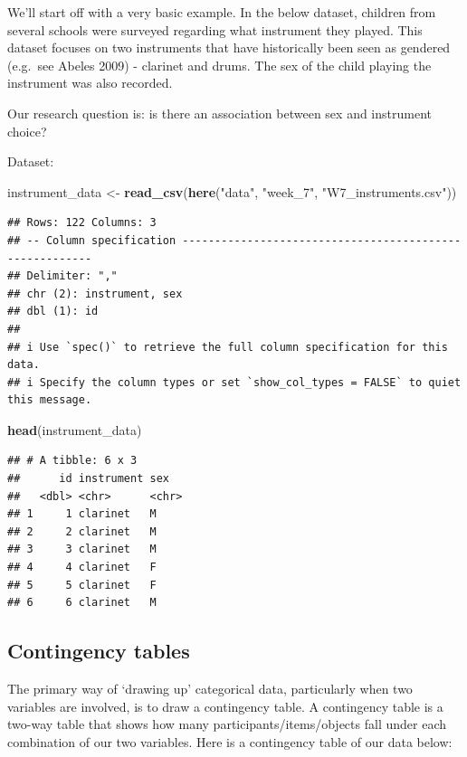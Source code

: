 \documentclass[
]{book}
\newenvironment{Shaded}{\begin{snugshade}}{\end{snugshade}}
\newcommand{\FunctionTok}[1]{\textcolor[rgb]{0.13,0.29,0.53}{\textbf{#1}}}
\newcommand{\NormalTok}[1]{#1}
\newcommand{\OtherTok}[1]{\textcolor[rgb]{0.56,0.35,0.01}{#1}}
\newcommand{\StringTok}[1]{\textcolor[rgb]{0.31,0.60,0.02}{#1}}
\begin{document}
We'll start off with a very basic example. In the below dataset, children from several schools were surveyed regarding what instrument they played. This dataset focuses on two instruments that have historically been seen as gendered (e.g.~see Abeles 2009) - clarinet and drums. The sex of the child playing the instrument was also recorded.

Our research question is: is there an association between sex and instrument choice?

Dataset:

\begin{Shaded}
\begin{Highlighting}[]
\NormalTok{instrument\_data }\OtherTok{\textless{}{-}} \FunctionTok{read\_csv}\NormalTok{(}\FunctionTok{here}\NormalTok{(}\StringTok{"data"}\NormalTok{, }\StringTok{"week\_7"}\NormalTok{, }\StringTok{"W7\_instruments.csv"}\NormalTok{))}
\end{Highlighting}
\end{Shaded}

\begin{verbatim}
## Rows: 122 Columns: 3
## -- Column specification --------------------------------------------------------
## Delimiter: ","
## chr (2): instrument, sex
## dbl (1): id
## 
## i Use `spec()` to retrieve the full column specification for this data.
## i Specify the column types or set `show_col_types = FALSE` to quiet this message.
\end{verbatim}

\begin{Shaded}
\begin{Highlighting}[]
\FunctionTok{head}\NormalTok{(instrument\_data)}
\end{Highlighting}
\end{Shaded}

\begin{verbatim}
## # A tibble: 6 x 3
##      id instrument sex  
##   <dbl> <chr>      <chr>
## 1     1 clarinet   M    
## 2     2 clarinet   M    
## 3     3 clarinet   M    
## 4     4 clarinet   F    
## 5     5 clarinet   F    
## 6     6 clarinet   M
\end{verbatim}

\hypertarget{contingency-tables}{%
\subsection{Contingency tables}\label{contingency-tables}}

The primary way of `drawing up' categorical data, particularly when two variables are involved, is to draw a contingency table. A contingency table is a two-way table that shows how many participants/items/objects fall under each combination of our two variables. Here is a contingency table of our data below:
\end{document}
